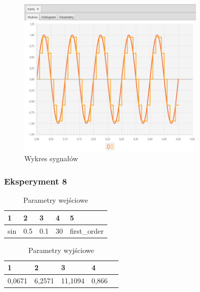 \documentclass[12pt]{article}
\begin{document}
{{{                \begin{figure}[H]
                    \centering
                    \includegraphics[width=0.8\textwidth]{img/result/experiment1/07/data_draw_original_chart_recon_output_130235.png}
                    \caption{Wykres sygnałów}
                \end{figure}
            }
            \newpage

            \subsubsection{Eksperyment 8} {
                \begin{table}[H]
                    \centering
                    \begin{tabular}{|l|l|l|l|l|}
                        \hline
                        1 & 2 & 3 & 4 & 5   \\ \hline
                        sin & 0.5 & 0.1 & 30 & first\_order   \\ \hline
                    \end{tabular}
                    \caption{Parametry wejściowe}
                \end{table}

                \begin{table}[H]
                    \centering
                    \begin{tabular}{|l|l|l|l|l|}
                        \hline
                        1 & 2 & 3 & 4   \\ \hline
                        0,0671 & 6,2571 & 11,1094 & 0,866  \\ \hline
                    \end{tabular}
                    \caption{Parametry wyjściowe}
                \end{table}


}}}
\end{document}
